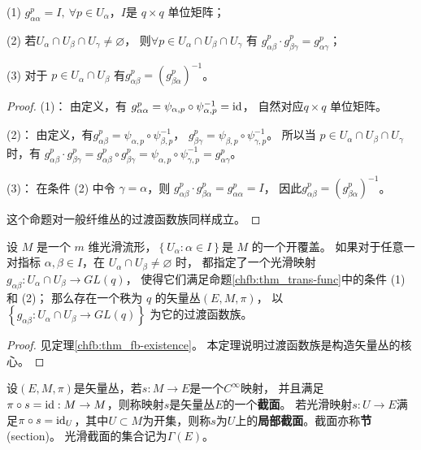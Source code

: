 \begin{proposition}\label{chfb:thm_trans-func}
(1) $g_{\alpha \alpha}^p=I,\ \forall p \in U_\alpha$，$I$是 $q \times q$ 单位矩阵；

(2) 若$U_\alpha \cap U_\beta \cap U_\gamma \neq \varnothing$，
则$\forall p \in U_\alpha \cap U_\beta \cap U_\gamma$ 有
$g_{\alpha \beta}^p \cdot g_{\beta \gamma}^p=g_{\alpha \gamma}^p $；

(3) 对于 $p \in U_\alpha \cap U_\beta$ 有$g_{\alpha \beta}^p=(g_{\beta \alpha}^p)^{-1} $。
\end{proposition}

\begin{proof}
    (1)： 由定义，有
    $ g_{\alpha \alpha}^p=\psi_{\alpha, p} \circ \psi_{\alpha, p}^{-1} = \mathrm{id}     $，
    自然对应$q \times q$ 单位矩阵。

(2)： 由定义，有$g_{\alpha \beta}^p=\psi_{\alpha, p} \circ \psi_{\beta, p}^{-1}$，
$g_{\beta \gamma}^p=\psi_{\beta, p} \circ \psi_{\gamma, p}^{-1}$。
所以当 $p \in U_\alpha \cap U_\beta \cap U_\gamma$ 时，有
$  g_{\alpha \beta}^p \cdot g_{\beta \gamma}^p
    =  g_{\alpha \beta}^p \circ g_{\beta \gamma}^p
    =  \psi_{\alpha, p} \circ \psi_{\gamma, p}^{-1}=g_{\alpha \gamma}^p$。

(3)： 在条件 (2) 中令 $\gamma=\alpha$，则
$g_{\alpha \beta}^p \cdot g_{\beta \alpha}^p=g_{\alpha\alpha}^p=I$，
因此$g_{\alpha \beta}^p=\left(g_{\beta \alpha}^p\right)^{-1} $。

这个命题对一般纤维丛的过渡函数族同样成立。
\end{proof}

\begin{theorem}\label{chfb:thm_vector-existence}
设 $M$ 是一个 $m$ 维光滑流形，$\left\{U_\alpha: \alpha \in I\right\}$是 $M$ 的一个开覆盖。
如果对于任意一对指标 $\alpha, \beta \in I$，在 $U_\alpha \cap U_\beta \neq \varnothing$ 时，
都指定了一个光滑映射 $g_{\alpha \beta}: U_\alpha \cap U_\beta \rightarrow GL(q)$，
使得它们满足命题\ref{chfb:thm_trans-func}中的条件 (1)和 (2)；
那么存在一个秩为 $q$ 的矢量丛$(E,M,\pi)$，
以 $\left\{g_{\alpha \beta}: U_\alpha \cap U_\beta \rightarrow GL(q)\right\}$ 为它的过渡函数族。
\end{theorem}

\begin{proof}
    见定理\ref{chfb:thm_fb-existence}。
    本定理说明过渡函数族是构造矢量丛的核心。
\end{proof}

\begin{definition}
    设$(E,M,\pi)$是矢量丛，若$s:M\to E$是一个$C^\infty$映射，
    并且满足$\pi \circ s = \mathrm{id}  :M\to M$，则称映射$s$是矢量丛$E$的一个\textbf{截面}。
    若光滑映射$s:U\to E$满足$\pi\circ s=\mathrm{id}_U$，其中$U\subset M$为开集，则称$s$为$U$上的\textbf{局部截面}。截面亦称\textbf{节}(section)。
    光滑截面的集合记为$\Gamma(E)$。
\end{definition}

